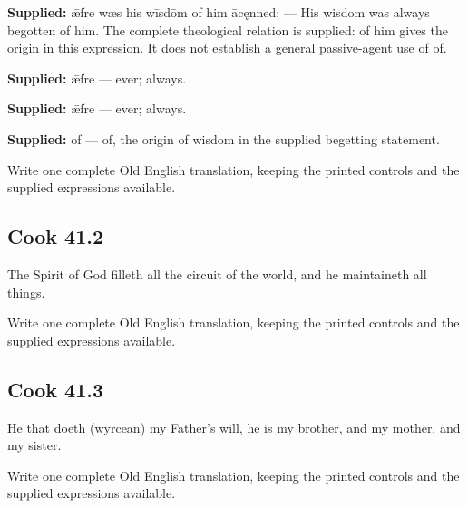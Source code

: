 \textbf{Supplied:} ǣfre wæs his wīsdōm of him ācęnned; — His wisdom was always begotten of him. The complete theological relation is supplied: of him gives the origin in this expression. It does not establish a general passive-agent use of of.

\textbf{Supplied:} ǣfre — ever; always.

\textbf{Supplied:} ǣfre — ever; always.

\textbf{Supplied:} of — of, the origin of wisdom in the supplied begetting statement.

Write one complete Old English translation, keeping the printed controls and the supplied expressions available.

\par\begin{minipage}{\linewidth}\raggedright
\subsection*{Cook 41.2}

The Spirit of God filleth all the circuit of the world, and he maintaineth all things.

Write one complete Old English translation, keeping the printed controls and the supplied expressions available.

\end{minipage}\par\addvspace{4pt}

\par\begin{minipage}{\linewidth}\raggedright
\subsection*{Cook 41.3}

He that doeth (wyrcean) my Father’s will, he is my brother, and my mother, and my sister.

Write one complete Old English translation, keeping the printed controls and the supplied expressions available.

\end{minipage}\par\addvspace{4pt}

